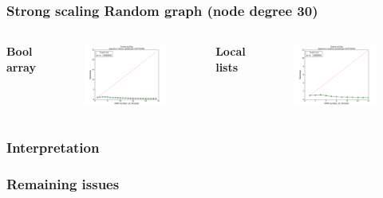 \begin{frame}
\frametitle{Strong scaling Random graph (node degree 30)}
\begin{columns}[T]
  \bfseries{Bool array}
  \begin{figure}[!ht]
    \begin{center}
      \includegraphics[width=\textwidth]{img/strongscaling_bitset_gtSOFTWARE_opt1.pdf}
    \end{center}
  \end{figure}

  \bfseries{Local lists}
  \begin{figure}[!ht]
    \begin{center}
      \includegraphics[width=\textwidth]{img/strongscaling_locallist_gtSOFTWARE_opt0.pdf}
    \end{center}
  \end{figure}
\end{columns}

\end{frame}

\begin{frame}
 \frametitle{Interpretation}
\end{frame}

\begin{frame}
 \frametitle{Remaining issues}
\end{frame}


 

